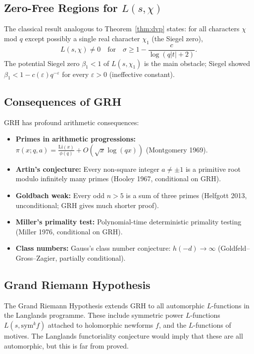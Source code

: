 \documentclass[12pt,a4paper]{article}
\theoremstyle{remark}
\begin{document}
\subsection{Zero-Free Regions for $L(s,\chi)$}

The classical result analogous to Theorem~\ref{thm:dvp} states: for all characters $\chi$
mod $q$ except possibly a single real character $\chi_1$ (the Siegel zero),
\[
  L(s,\chi) \neq 0 \quad\text{for}\quad \sigma \geq 1 - \frac{c}{\log(q|t|+2)}.
\]
The potential Siegel zero $\beta_1 < 1$ of $L(s,\chi_1)$ is the main obstacle; Siegel
showed $\beta_1 < 1 - c(\varepsilon)q^{-\varepsilon}$ for every $\varepsilon>0$ (ineffective constant).

\subsection{Consequences of GRH}

GRH has profound arithmetic consequences:
\begin{itemize}[nosep]
  \item \textbf{Primes in arithmetic progressions:}
    $\pi(x;q,a) = \frac{\mathrm{Li}(x)}{\phi(q)} + O\!\left(\sqrt{x}\log(qx)\right)$
    (Montgomery 1969).
  \item \textbf{Artin's conjecture:} Every non-square integer $a\neq\pm1$ is a primitive
    root modulo infinitely many primes (Hooley 1967, conditional on GRH).
  \item \textbf{Goldbach weak:} Every odd $n>5$ is a sum of three primes (Helfgott 2013,
    unconditional; GRH gives much shorter proof).
  \item \textbf{Miller's primality test:} Polynomial-time deterministic primality testing
    (Miller 1976, conditional on GRH).
  \item \textbf{Class numbers:} Gauss's class number conjecture: $h(-d)\to\infty$
    (Goldfeld--Gross--Zagier, partially conditional).
\end{itemize}

\subsection{Grand Riemann Hypothesis}

The Grand Riemann Hypothesis extends GRH to all automorphic $L$-functions in the
Langlands programme.  These include symmetric power $L$-functions
$L(s,\mathrm{sym}^k f)$ attached to holomorphic newforms $f$, and the $L$-functions
of motives.  The Langlands functoriality conjecture would imply that these are all
automorphic, but this is far from proved.
\end{document}
